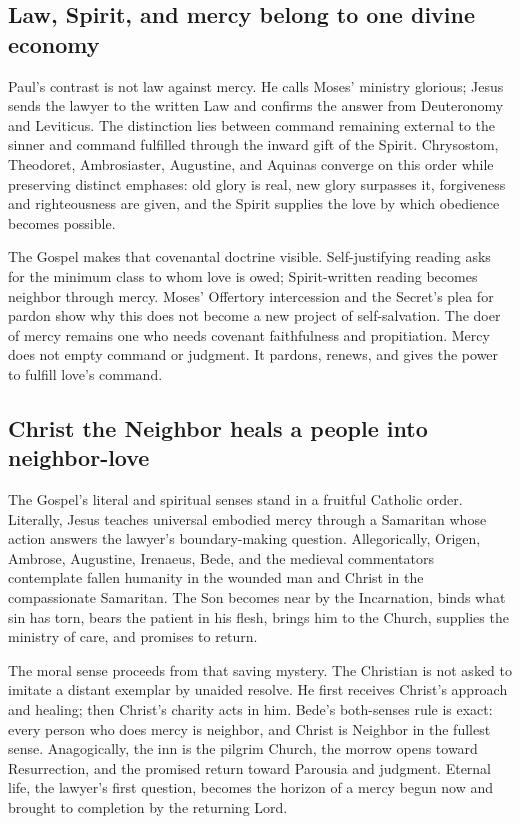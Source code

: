 \subsection*{Law, Spirit, and mercy belong to one divine economy}

Paul's contrast is not law against mercy. He calls Moses' ministry glorious;
Jesus sends the lawyer to the written Law and confirms the answer from
Deuteronomy and Leviticus. The distinction lies between command remaining
external to the sinner and command fulfilled through the inward gift of the
Spirit. Chrysostom, Theodoret, Ambrosiaster, Augustine, and Aquinas converge on
this order while preserving distinct emphases: old glory is real, new glory
surpasses it, forgiveness and righteousness are given, and the Spirit supplies
the love by which obedience becomes possible.

The Gospel makes that covenantal doctrine visible. Self-justifying reading
asks for the minimum class to whom love is owed; Spirit-written reading becomes
neighbor through mercy. Moses' Offertory intercession and the Secret's plea for
pardon show why this does not become a new project of self-salvation. The doer
of mercy remains one who needs covenant faithfulness and propitiation. Mercy
does not empty command or judgment. It pardons, renews, and gives the power to
fulfill love's command.

\subsection*{Christ the Neighbor heals a people into neighbor-love}

The Gospel's literal and spiritual senses stand in a fruitful Catholic order.
Literally, Jesus teaches universal embodied mercy through a Samaritan whose
action answers the lawyer's boundary-making question. Allegorically, Origen,
Ambrose, Augustine, Irenaeus, Bede, and the medieval commentators contemplate
fallen humanity in the wounded man and Christ in the compassionate Samaritan.
The Son becomes near by the Incarnation, binds what sin has torn, bears the
patient in his flesh, brings him to the Church, supplies the ministry of care,
and promises to return.

The moral sense proceeds from that saving mystery. The Christian is not asked
to imitate a distant exemplar by unaided resolve. He first receives Christ's
approach and healing; then Christ's charity acts in him. Bede's both-senses
rule is exact: every person who does mercy is neighbor, and Christ is Neighbor
in the fullest sense. Anagogically, the inn is the pilgrim Church, the morrow
opens toward Resurrection, and the promised return toward Parousia and
judgment. Eternal life, the lawyer's first question, becomes the horizon of a
mercy begun now and brought to completion by the returning Lord.

